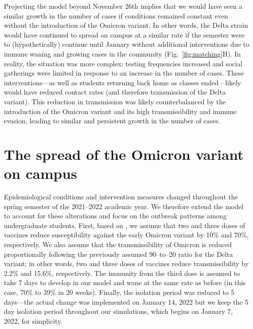 \documentclass[12pt]{article}
\newcommand{\fref}[1]{Fig.~\ref{fig:#1}}
\begin{document}
Projecting the model beyond November 26th implies that we would have seen a similar growth in the number of cases if conditions remained constant even without the introduction of the Omicron variant.
In other words, the Delta strain would have continued to spread on campus at a similar rate if the semester were to (hypothetically) continue until January without additional interventions due to immune waning and growing cases in the community (\fref{matching}H).
In reality, the situation was more complex: testing frequencies increased and social gatherings were limited in response to an increase in the number of cases.
These interventions---as well as students returning back home as classes ended---likely would have reduced contact rates (and therefore transmission of the Delta variant).
This reduction in transmission was likely counterbalanced by the introduction of the Omicron variant and its high transmissibility and immune evasion, leading to similar and persistent growth in the number of cases.

\section*{The spread of the Omicron variant on campus}

Epidemiological conditions and intervention measures changed throughout the spring semester of the 2021--2022 academic year.
We therefore extend the model to account for these alterations and focus on the outbreak patterns among undergraduate students.
First, based on \cite{ferguson2021report}, we assume that two and three doses of vaccines reduce susceptibility against the early Omicron variant by 10\% and 70\%, respectively. 
We also assume that the transmissibility of Omicron is reduced proportionally following the previously assumed 90--to--20 ratio for the Delta variant;
in other words, two and three doses of vaccines reduce transmissibility by 2.2\% and 15.6\%, respectively.
The immunity from the third dose is assumed to take 7 days to develop in our model \citep{moreira2022safety} and wane at the same rate as before (in this case, 70\% to 39\% in 20 weeks).
Finally, the isolation period was reduced to 5 days---the actual change was implemented on January 14, 2022 but we keep the 5 day isolation period throughout our simulations, which begins on January 7, 2022, for simplicity.
\end{document}
